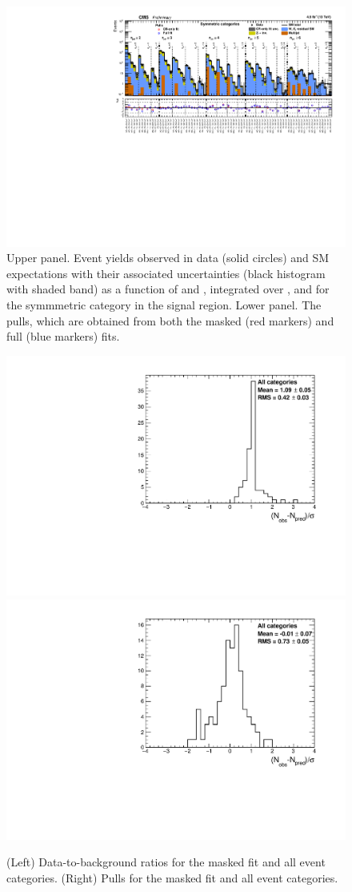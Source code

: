 \clearpage
\begin{figure}[h!]
  \centering
  \caption{Upper panel. Event yields observed in data (solid circles)
    and SM expectations with their associated uncertainties (black
    histogram with shaded band) as a function of \nb and \scalht,
    integrated over \mht, and for the symmmetric \njet category
    in the signal region. Lower panel. The pulls, which are obtained
    from both the masked (red markers) and full (blue markers) fits. }
  \label{fig:mr_symm_pulls}
  \includegraphics[width=1.\linewidth]{figures/results/symm/summaryPlot_Symmetric_prefit_overlay_fit_b}
\end{figure}


\clearpage
\begin{figure}[h!]
  \centering
  \caption{(Left) Data-to-background ratios for the masked fit and all
    event categories. (Right) Pulls for the masked fit and all
    event categories.}
  \label{fig:ratios_and_pulls}
  \includegraphics[width=0.49\linewidth]{figures/results/all/ratios_all_prefit.pdf}
  \includegraphics[width=0.49\linewidth]{figures/results/all/pulls_all_prefit.pdf}
\end{figure}

